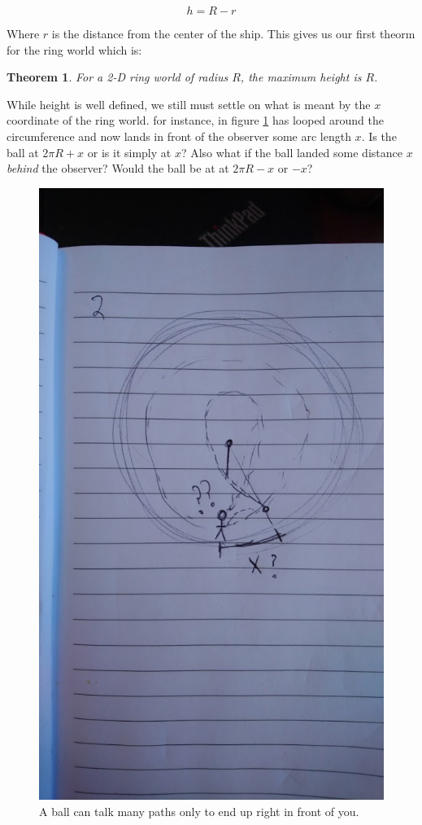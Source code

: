 \documentclass{amsart}
\newtheorem{theorem}{Theorem}[section]
\theoremstyle{definition}
\begin{document}
\[h = R - r\]

Where $r$ is the distance from the center of the ship. This gives us our first theorm for the ring world which is:
\begin{theorem}
  For a 2-D ring world of radius $R$, the maximum height is $R$.
\end{theorem}

While height is well defined, we still must settle on what is meant by the $x$ coordinate of the ring world. 
for instance, in figure \ref{fig:what_is_x} has looped around the circumference and now lands in front of the observer some arc length $x$.
Is the ball at $2\pi R + x$ or is it simply at $x$? Also what if the ball landed some distance $x$ \textit{behind} the observer?
Would the ball be at at $2\pi R - x$ or $-x$? \newline 

\begin{figure}
	\centering
	\includegraphics[width=0.7\linewidth]{figures/define_horizontal_pos_rough.JPG}
	\caption{A ball can talk many paths only to end up right in front of you.}
	\label{fig:what_is_x}
\end{figure}
\end{document}
